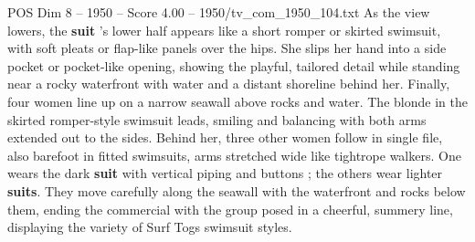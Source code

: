 \begin{textsample}{POS Dim 8 – 1950 – Score 4.00 – 1950/tv\_com\_1950\_104.txt}
As the view lowers, the \textbf{suit} ’s lower half appears like a short romper or skirted swimsuit, with soft pleats or flap-like panels over the hips.
She slips her hand into a side pocket or pocket-like opening, showing the playful, tailored detail while standing near a rocky waterfront with water and a distant shoreline behind her.
Finally, four women line up on a narrow seawall above rocks and water.
The blonde in the skirted romper-style swimsuit leads, smiling and balancing with both arms extended out to the sides.
Behind her, three other women follow in single file, also barefoot in fitted swimsuits, arms stretched wide like tightrope walkers.
One wears the dark \textbf{suit} with vertical piping and buttons ; the others wear lighter \textbf{suits}.
They move carefully along the seawall with the waterfront and rocks below them, ending the commercial with the group posed in a cheerful, summery line, displaying the variety of Surf Togs swimsuit styles.

\end{textsample}
